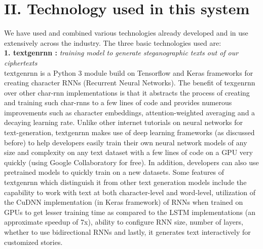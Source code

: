 \documentclass[12pt]{article}
\begin{document}
\section*{II. Technology used in this system}

We have used and combined various technologies already developed and in use extensively across the industry. The three basic technologies used are:\\

\textbf{1. textgenrnn :} \emph{training model to generate steganographic texts out of our ciphertexts}\\  
textgenrnn is a Python 3 module build on Tensorflow and Keras frameworks for creating character RNNs (Recurrent Neural Networks). The benefit of texgenrnn over other char-rnn implementations is that it abstracts the process of creating and training such char-rnns to a few lines of code and provides numerous improvements such as character embeddings, attention-weighted averaging and a decaying learning rate. Unlike other internet tutorials on neural networks for text-generation, textgenrnn makes use of deep learning frameworks (as discussed before) to help developers easily train their own neural network models of any size and complexity on any text dataset with a few lines of code on a GPU very quickly (using Google Collaboratory for free). In addition, developers can also use pretrained models to quickly train on a new datasets.
 Some features of textgenrnn which distinguish it from other text generation models include the capability to work with text at both character-level and word-level, utilization of the CuDNN implementation (in Keras framework) of RNNs when trained on GPUs to get lesser training time as compared to the LSTM implementations (an approximate speedup of 7x), ability to configure RNN size, number of layers, whether to use bidirectional RNNs and lastly, it generates text interactively for customized stories.\\
 
\end{document}
